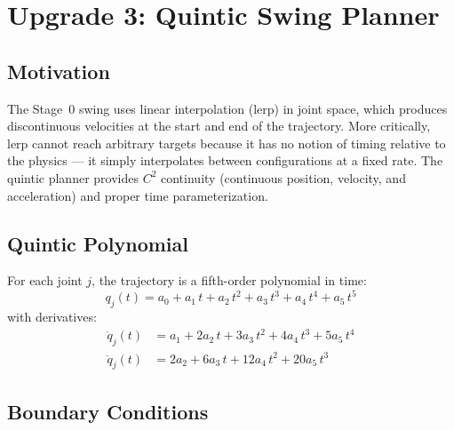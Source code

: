 \documentclass[11pt,letterpaper]{article}
\begin{document}
\section{Upgrade 3: Quintic Swing Planner}
\label{sec:swing}

\subsection{Motivation}

The Stage~0 swing uses linear interpolation (lerp) in joint space, which produces discontinuous velocities at the start and end of the trajectory.  More critically, lerp cannot reach arbitrary targets because it has no notion of timing relative to the physics --- it simply interpolates between configurations at a fixed rate.  The quintic planner provides $C^2$ continuity (continuous position, velocity, and acceleration) and proper time parameterization.

\subsection{Quintic Polynomial}

For each joint $j$, the trajectory is a fifth-order polynomial in time:
\begin{equation}
    q_j(t) = a_0 + a_1\,t + a_2\,t^2 + a_3\,t^3 + a_4\,t^4 + a_5\,t^5
\end{equation}
with derivatives:
\begin{align}
    \dot{q}_j(t) &= a_1 + 2a_2\,t + 3a_3\,t^2 + 4a_4\,t^3 + 5a_5\,t^4 \\
    \ddot{q}_j(t) &= 2a_2 + 6a_3\,t + 12a_4\,t^2 + 20a_5\,t^3
\end{align}

\subsection{Boundary Conditions}
\end{document}

